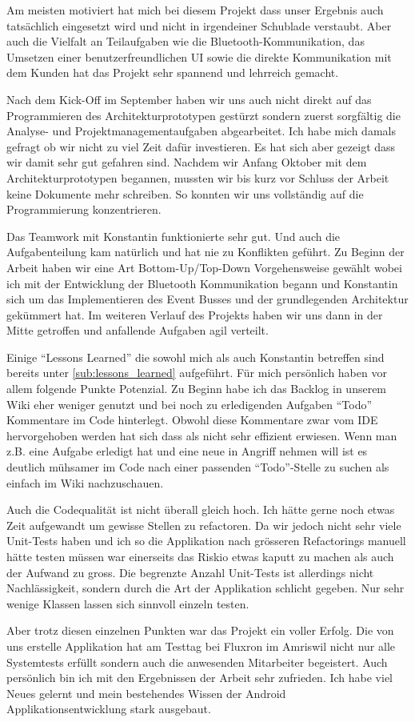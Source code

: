 Am meisten motiviert hat mich bei diesem Projekt dass unser Ergebnis auch tatsächlich eingesetzt wird und nicht in irgendeiner Schublade verstaubt. Aber auch die Vielfalt an Teilaufgaben wie die Bluetooth-Kommunikation, das Umsetzen einer benutzerfreundlichen UI sowie die direkte Kommunikation mit dem Kunden  hat das Projekt sehr spannend und lehrreich gemacht. 

Nach dem Kick-Off im September haben wir uns auch nicht direkt auf das Programmieren des Architekturprototypen gestürzt sondern zuerst sorgfältig die Analyse- und Projektmanagementaufgaben abgearbeitet. Ich habe mich damals gefragt ob wir nicht zu viel Zeit dafür investieren. Es hat sich aber gezeigt dass wir damit sehr gut gefahren sind. Nachdem wir Anfang Oktober mit dem Architekturprototypen begannen, mussten wir bis kurz vor Schluss der Arbeit keine Dokumente mehr schreiben. So konnten wir uns vollständig auf die Programmierung konzentrieren. 

Das Teamwork mit Konstantin funktionierte sehr gut. Und auch die Aufgabenteilung kam natürlich und hat nie zu Konflikten geführt. Zu Beginn der Arbeit haben wir eine Art Bottom-Up/Top-Down Vorgehensweise gewählt wobei ich mit der Entwicklung der Bluetooth Kommunikation begann und Konstantin sich um das Implementieren des Event Busses und der grundlegenden Architektur gekümmert hat. Im weiteren Verlauf des Projekts haben wir uns dann in der Mitte getroffen und anfallende Aufgaben agil verteilt.

Einige \enquote{Lessons Learned} die sowohl mich als auch Konstantin betreffen sind bereits unter \ref{sub:lessons_learned} aufgeführt. Für mich persönlich haben vor allem folgende Punkte Potenzial. Zu Beginn habe ich das Backlog in unserem Wiki eher weniger genutzt und bei noch zu erledigenden Aufgaben \enquote{Todo} Kommentare im Code hinterlegt. Obwohl diese Kommentare zwar vom \ac{IDE} hervorgehoben werden hat sich dass als nicht sehr effizient erwiesen. Wenn man z.B. eine Aufgabe erledigt hat und eine neue in Angriff nehmen will ist es deutlich mühsamer im Code nach einer passenden \enquote{Todo}-Stelle zu suchen als einfach im Wiki nachzuschauen.

Auch die Codequalität ist nicht überall gleich hoch. Ich hätte gerne noch etwas Zeit aufgewandt um gewisse Stellen zu refactoren. Da wir jedoch nicht sehr viele Unit-Tests haben und ich so die Applikation nach grösseren Refactorings manuell hätte testen müssen war einerseits das Riskio etwas kaputt zu machen als auch der Aufwand zu gross. Die begrenzte Anzahl Unit-Tests ist allerdings nicht Nachlässigkeit, sondern durch die Art der Applikation schlicht gegeben. Nur sehr wenige Klassen lassen sich sinnvoll einzeln testen. 

Aber trotz diesen einzelnen Punkten war das Projekt ein voller Erfolg. Die von uns erstelle Applikation hat am Testtag bei Fluxron im Amriswil nicht nur alle Systemtests erfüllt sondern auch die anwesenden Mitarbeiter begeistert. Auch persönlich bin ich mit den Ergebnissen der Arbeit sehr zufrieden. Ich habe viel Neues gelernt und mein bestehendes Wissen der Android Applikationsentwicklung stark ausgebaut.